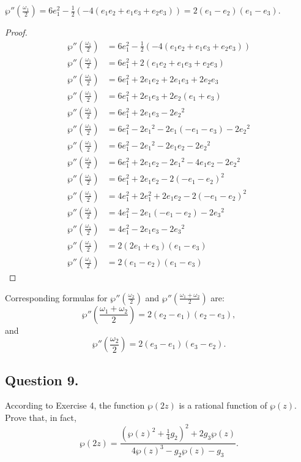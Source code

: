\begin{proposition}
    $\wp''(\frac{\omega_1}{2})=6e_1^2-\frac{1}{2}(-4(e_1 e_2 + e_1 e_3 + e_2 e_3))=2 (e_1 - e_2)(e_1 - e_3).$
\end{proposition}

\begin{proof}

    \begin{align*}
        \wp''(\frac{\omega_1}{2}) &=6e_1^2-\frac{1}{2}(-4(e_1 e_2 + e_1 e_3 + e_2 e_3)) \\
        \wp''(\frac{\omega_1}{2}) &=6e_1^2+2(e_1 e_2 + e_1 e_3 + e_2 e_3) \\
        \wp''(\frac{\omega_1}{2}) &=6e_1^2+2e_1 e_2 + 2e_1 e_3 + 2e_2 e_3 \\
        \wp''(\frac{\omega_1}{2}) &=6e_1^2+2e_1 e_3 + 2e_2 (e_1 +  e_3) \\
        \wp''(\frac{\omega_1}{2}) &=6e_1^2+2e_1 e_3 - 2{e_2}^2 \\
        \wp''(\frac{\omega_1}{2}) &=6e_1^2-2{e_1}^2-2e_1(-e_1-e_3)- 2{e_2}^2 \\
        \wp''(\frac{\omega_1}{2}) &=6e_1^2-2{e_1}^2-2e_1e_2- 2{e_2}^2 \\
        \wp''(\frac{\omega_1}{2}) &=6e_1^2 + 2e_1 e_2 - 2{e_1}^2 -4 e_1 e_2 - 2{e_2}^2 \\
        \wp''(\frac{\omega_1}{2}) &=6e_1^2 + 2e_1 e_2 - 2(-e_1-e_2)^2 \\
        \wp''(\frac{\omega_1}{2}) &=4e_1^2 + 2e_1^2 + 2e_1 e_2 - 2(-e_1-e_2)^2 \\
        \wp''(\frac{\omega_1}{2}) &=4e_1^2 -2e_1 (-e_1-e_2) - 2{e_3}^2 \\
        \wp''(\frac{\omega_1}{2}) &=4e_1^2 -2e_1 e_3 - 2{e_3}^2 \\
        \wp''(\frac{\omega_1}{2}) &=2(2e_1+e_3)(e_1-e_3) \\
        \wp''(\frac{\omega_1}{2}) &=2(e_1-e_2)(e_1-e_3)
    \end{align*}

\end{proof}

Corresponding formulas for $\wp''(\frac{\omega_2}{2})$ and $\wp''(\frac{\omega_1 + \omega_2}{2})$ are:
\[
    \wp''(\frac{\omega_1+\omega_2}{2})=2 (e_2 - e_1)(e_2 - e_3),
\]
and
\[
    \wp''(\frac{\omega_2}{2})=2 (e_3 - e_1)(e_3 - e_2).
\]


\subsection{Question 9.}
\noindent
According to Exercise 4, the function $\wp(2z)$ is a rational function of $\wp(z)$. Prove that, in fact,
\[
    \wp(2z) = \frac{(\wp(z)^2 + \frac{1}{4}g_2)^2+2g_3\wp(z)}{4\wp(z)^3-g_2\wp(z)-g_3}.
\]

